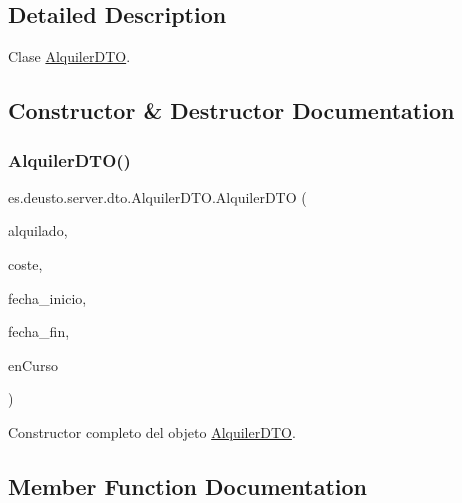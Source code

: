 \subsection{Detailed Description}
Clase \mbox{\hyperlink{classes_1_1deusto_1_1server_1_1dto_1_1_alquiler_d_t_o}{Alquiler\+D\+TO}}. 

\subsection{Constructor \& Destructor Documentation}
\mbox{\label{classes_1_1deusto_1_1server_1_1dto_1_1_alquiler_d_t_o_aa488aa0095e5e2cabcbbe16c9f6db2e9}} 
\subsubsection{\texorpdfstring{AlquilerDTO()}{AlquilerDTO()}}
{\footnotesize\ttfamily es.\+deusto.\+server.\+dto.\+Alquiler\+D\+T\+O.\+Alquiler\+D\+TO (\begin{DoxyParamCaption}\item[{\mbox{\hyperlink{classes_1_1deusto_1_1server_1_1dto_1_1_articulo_d_t_o}{Articulo\+D\+TO}}}]{alquilado,  }\item[{double}]{coste,  }\item[{String}]{fecha\+\_\+inicio,  }\item[{String}]{fecha\+\_\+fin,  }\item[{boolean}]{en\+Curso }\end{DoxyParamCaption})}

Constructor completo del objeto \mbox{\hyperlink{classes_1_1deusto_1_1server_1_1dto_1_1_alquiler_d_t_o}{Alquiler\+D\+TO}}. 

\subsection{Member Function Documentation}
\mbox{\label{classes_1_1deusto_1_1server_1_1dto_1_1_alquiler_d_t_o_ab872b982cf52cbf63fdc40e1faca2e55}} 
